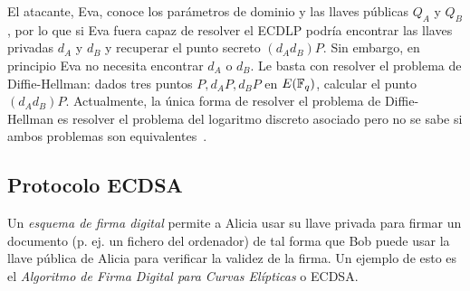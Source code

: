 El atacante, Eva, conoce los parámetros de dominio y las llaves públicas $Q_A$ y $Q_B$, por lo que si Eva fuera capaz de resolver el ECDLP podría encontrar las llaves privadas $d_A$ y $d_B$ y recuperar el punto secreto $(d_A d_B) P$. Sin embargo, en principio Eva no necesita encontrar $d_A$ o $d_B$. Le basta con resolver el problema de Diffie-Hellman: dados tres puntos $P, d_A P, d_B P$ en $E(\mathbb{F}_q)$, calcular el punto $(d_A d_B) P$. Actualmente, la única forma de resolver el problema de Diffie-Hellman es resolver el problema del logaritmo discreto asociado pero no se sabe si ambos problemas son equivalentes~\cite{Hankerson:2003}.

\subsection{Protocolo ECDSA}
\label{sub:Protocolo ECDSA}

Un \emph{esquema de firma digital} permite a Alicia usar su llave privada para firmar un documento (p. ej. un fichero del ordenador) de tal forma que Bob puede usar la llave pública de Alicia para verificar la validez de la firma. Un ejemplo de esto es el \emph{Algoritmo de Firma Digital para Curvas Elípticas} o ECDSA.

